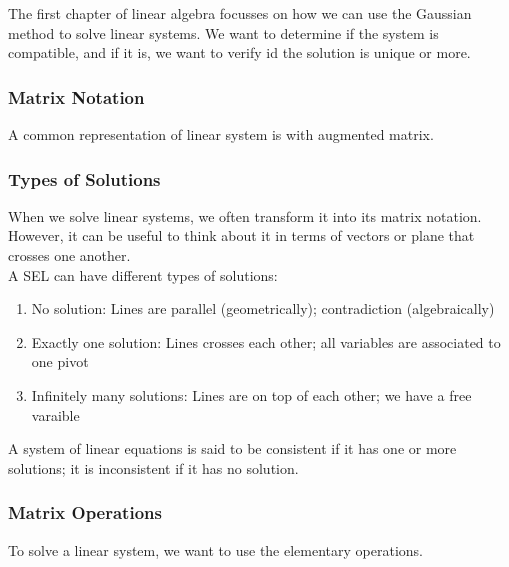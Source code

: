 \documentclass{article}
\begin{document}

The first chapter of linear algebra focusses on how we can use the Gaussian
method to solve linear systems. We want to determine if the system is compatible,
and if it is, we want to verify id the solution is unique or more.

\subsubsection{Matrix Notation}

A common representation of linear system is with augmented matrix.

\subsubsection{Types of Solutions}

When we solve linear systems, we often transform it into its matrix notation.
However, it can be useful to think about it in terms of vectors or plane that
crosses one another.\\

A SEL can have different types of solutions:

\begin{enumerate}
    \item No solution: Lines are parallel (geometrically); contradiction (algebraically)
    \item Exactly one solution: Lines crosses each other; all variables are associated to one pivot
    \item Infinitely many solutions: Lines are on top of each other; we have a free varaible
\end{enumerate}

\begin{definition}
    A system of linear equations is said to be consistent if it has one or more
    solutions; it is inconsistent if it has no solution.
\end{definition}

\subsubsection{Matrix Operations}

To solve a linear system, we want to use the elementary operations.
\end{document}
